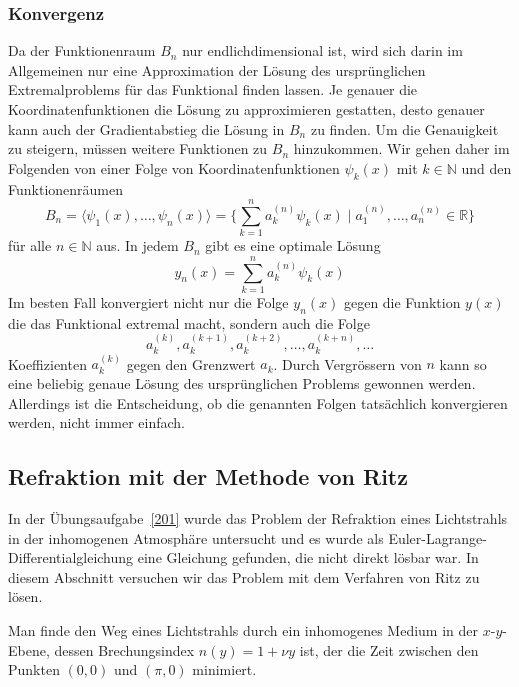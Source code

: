 %
%
\subsubsection{Konvergenz}
Da der Funktionenraum $B_n$ nur endlichdimensional ist, wird sich darin
im Allgemeinen nur eine Approximation der Lösung des ursprünglichen
Extremalproblems für das Funktional finden lassen.
Je genauer die Koordinatenfunktionen die Lösung zu approximieren gestatten,
desto genauer kann auch der Gradientabstieg die Lösung in $B_n$ zu finden.
Um die Genauigkeit zu steigern, müssen weitere Funktionen zu $B_n$ hinzukommen.
Wir gehen daher im Folgenden von einer Folge von Koordinatenfunktionen
$\psi_k(x)$ mit $k\in \mathbb{N}$ und den Funktionenräumen
\[
B_n
=
\langle \psi_1(x),\dots,\psi_n(x)\rangle
=
\biggl\{
\sum_{k=1}^n a_k^{(n)} \psi_k(x)
\;
\bigg|
\;
a_1^{(n)},\dots,a_n^{(n)}\in\mathbb{R}
\biggr\}
\]
für alle $n\in\mathbb{N}$ aus.
In jedem $B_n$ gibt es eine optimale Lösung
\[
y_n(x)
=
\sum_{k=1}^n a_k^{(n)} \psi_k(x)
\]
Im besten Fall konvergiert nicht nur die Folge $y_n(x)$ gegen die
Funktion $y(x)$ die das Funktional extremal macht, sondern auch
die Folge
\[
a_k^{(k)},
a_k^{(k+1)},
a_k^{(k+2)},
\dots,
a_k^{(k+n)},
\dots
\]
Koeffizienten $a_k^{(k)}$ gegen den Grenzwert $a_k$.
Durch Vergrössern von $n$ kann so eine beliebig genaue Lösung des
ursprünglichen Problems gewonnen werden.
Allerdings ist die Entscheidung, ob die genannten Folgen tatsächlich
konvergieren werden, nicht immer einfach.

%
%
\subsection{Refraktion mit der Methode von Ritz
\label{buch:direkt:ritz:subsection:refraktion}}
In der Übungsaufgabe~\ref{201} wurde das Problem der Refraktion eines
Lichtstrahls in der inhomogenen Atmosphäre untersucht und es wurde als
Euler-Lagrange-Differentialgleichung eine Gleichung gefunden, die nicht
direkt lösbar war.
In diesem Abschnitt versuchen wir das Problem mit dem Verfahren von Ritz
zu lösen.

\begin{aufgabe}
\label{buch:direkt:ritz:aufgabe:lichtstrahl}
Man finde den Weg eines Lichtstrahls durch ein inhomogenes Medium
in der $x$-$y$-Ebene,
dessen Brechungsindex $n(y)=1+\nu y$ ist, der die Zeit zwischen
den Punkten $(0,0)$ und $(\pi,0)$ minimiert.
\end{aufgabe}


